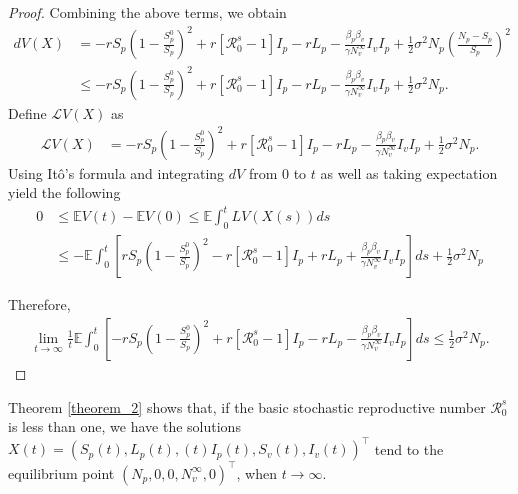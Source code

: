 \begin{proof}
	Combining the above terms, we obtain
	\begin{align*}
		dV(X) 
			&=
				-r S_p
				\left(
					1 - \frac{S_p^0}{S_p}
				\right) ^ 2 + 
				r 
				\left[
					\mathcal{R} ^ s_0 - 1
				\right] I_p - 
				r L_p - 
				\frac{\beta_p \beta_v}{\gamma N ^ \infty_v}I_v I_p + 
				\frac{1}{2} \sigma^2 N_p
				\left(
					\frac{N_p - S_p}{S_p}
				\right)^2\\
			&\leq
				-rS_p\left(
					1 - \frac{S_p^0}{S_p}
				\right) ^ 2 +
				r 
				\left[
					\mathcal{R}^s_0 - 1
				\right] I_p - 
				r L_p - 
				\frac{\beta_p\beta_v}{\gamma N^\infty_v} I_v I_p + 
				\frac{1}{2} 
				\sigma^2 N_p.
	\end{align*}
	Define $\mathcal{L}V(X)$ as
	\begin{align*}
		\mathcal{L}V(X) 
			&=
				-r S_p
				\left(
					1 - \frac{S_p^0}{S_p}
				\right) ^ 2 + 
				r 
				\left[
					\mathcal{R} ^ s_0 - 1
				\right] I_p - 
				r L_p - 
				\frac{\beta_p\beta_v}{\gamma N ^ \infty_v} I_v I_p + 
				\frac{1}{2} 
				\sigma ^ 2 
				N_p.
	\end{align*}
	Using It\^{o}'s formula and integrating $dV$ from 
	$0$ to $t$ as well as taking expectation yield the following
	\begin{align*}
		0 
			&\leq
				\mathbb{E}V(t) - 
				\mathbb{E}V(0) \leq 
				\mathbb{E}
				\int_{0} ^ {t} LV(X(s)) ds 
			\\
			&\leq
				-\mathbb{E}
					\int_{0} ^ {t}
						\left[
							r S_p 
							\left(
								1 - \frac{S_p^0}{S_p}
							\right) ^ 2 - 
							r 
							\left[
								\mathcal{R}^s_0 - 1
							\right] I_p + r L_p + 
							\frac{\beta_p\beta_v}{\gamma N^\infty_v} I_v I_p
						\right]ds + 
				 \frac{1}{2}\sigma^2 N_p
	\end{align*}
	
	Therefore,
	\begin{align*}
		\lim\limits_{t\to \infty}
		\frac{1}{t}
		\mathbb{E}
			\int_{0} ^ {t}
			\left[
				-r S_p
				\left(
					1 - \frac{S_p ^ 0}{S_p}
				\right) ^ 2 +
				r
				\left[
					\mathcal{R}^s_0 - 1
				\right] I_p - 
				r L_p - 
				\frac{\beta_p \beta_v}{\gamma N ^ \infty_v} I_v I_p
			\right]ds\leq \frac{1}{2}\sigma^2 N_p.
	\end{align*}
		
\end{proof}
\begin{remark}
	Theorem \ref{theorem_2} shows that, if the basic stochastic reproductive 
	number $\mathcal{R}^s_0$ is less than one, we have the solutions 
	$X(t)=(S_p (t), L_p (t), (t ) I_p (t), S_v (t), I_v (t))^{\top}$ 
	tend to the equilibrium point 
	$(N_p, 0,0, N_v^{\infty}, 0)^{\top}$, 
	when $t\rightarrow \infty$.
\end{remark}
